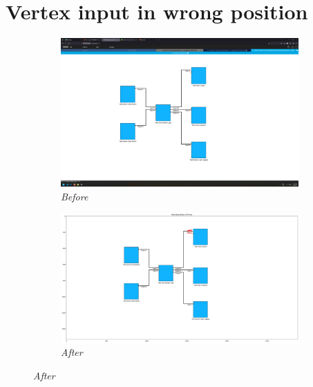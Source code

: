 \documentclass{article}
\begin{document}
\section{Vertex input in wrong position}
\begin{figure}[H]
    \centering
    \begin{subfigure}[t]{0.9\textwidth}
        \centering
        \includegraphics[width=\textwidth]{testcases/vertex_input_wrong_position/134736-128123_input_image.png}
        \caption*{\textit{Before}}
    \end{subfigure}
    \newline
    \begin{subfigure}[t]{0.9\textwidth}
        \centering
        \includegraphics[width=\textwidth]{testcases/vertex_input_wrong_position/134756-619713_element_bbox_errors_labeled_colored.png}
        \caption*{\textit{After}}
    \end{subfigure}
    \label{fig:vertex_input_wrong_position}
\end{figure}
\newpage
\end{document}
